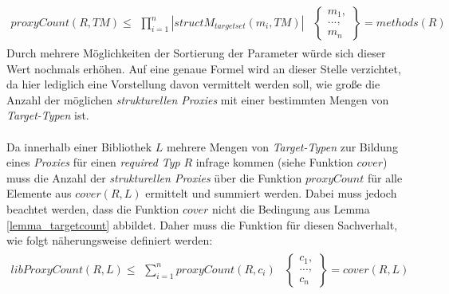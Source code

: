 \begin{gather*}
\mathit{proxyCount(R,TM)} \leq 
\begin{array}{l|l}
\prod\limits_{i=1}^{n}|\mathit{structM_{targetset}(m_i, TM)}|
&
\left\{
\begin{array}{l}
m_1,\\
...,\\
m_n
\end{array}
\right\}
= \mathit{methods(R)}
\end{array}
\end{gather*}
\noindent
Durch mehrere Möglichkeiten der Sortierung der Parameter würde sich dieser Wert nochmals erhöhen. Auf eine genaue Formel wird an dieser Stelle verzichtet, da hier lediglich eine Vorstellung davon vermittelt werden soll, wie große die Anzahl der möglichen \emph{strukturellen Proxies} mit einer bestimmten Mengen von \emph{Target-Typen} ist.
\\\\
Da innerhalb einer Bibliothek $L$ mehrere Mengen von \emph{Target-Typen} zur Bildung eines \emph{Proxies} für einen \emph{required Typ} $R$ infrage kommen (siehe Funktion $\mathit{cover}$) muss die Anzahl der \emph{strukturellen Proxies} über die Funktion $\mathit{proxyCount}$ für alle Elemente aus $\mathit{cover(R,L)}$ ermittelt und summiert werden. Dabei muss jedoch beachtet werden, dass die Funktion $\mathit{cover}$ nicht die Bedingung aus Lemma \ref{lemma_targetcount} abbildet. Daher muss die Funktion für diesen Sachverhalt, wie folgt näherungsweise definiert werden:
\begin{gather*}
\mathit{libProxyCount(R,L)} \leq 
\begin{array}{l|l}
\sum_{i=1}^{n}\mathit{proxyCount(R,c_i)}
&
\left\{
\begin{array}{l}
c_1,\\
...,\\
c_n
\end{array}
\right\} = \mathit{cover(R,L)}
\end{array}
\end{gather*}